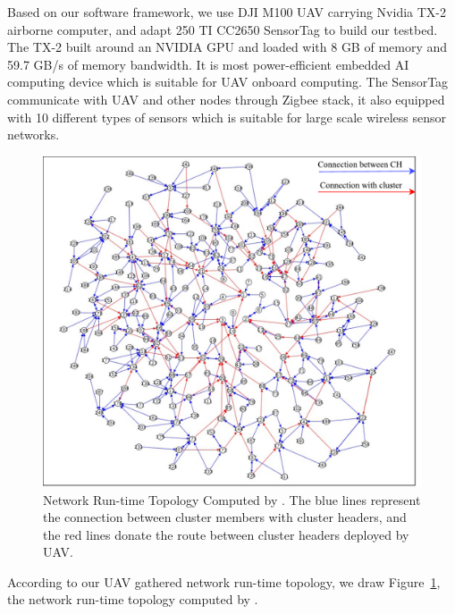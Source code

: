 Based on our software framework, we use DJI M100 UAV carrying Nvidia TX-2 airborne
computer, and adapt 250 TI CC2650 SensorTag to build our testbed. The TX-2 built around an NVIDIA GPU 
and loaded with 8 GB of memory and 59.7 GB/s of memory bandwidth. It is most power-efficient embedded 
AI computing device which is suitable for UAV onboard computing. The SensorTag communicate with UAV and
other nodes through Zigbee stack, it also equipped with 10 different types of sensors which is suitable for 
large scale wireless sensor networks.

\begin{figure}[htbp]
	\centering
	\includegraphics[width=.85\columnwidth]{Figure/topology}
	\vspace{-0.1in}
	\caption{Network Run-time Topology Computed by {\sdn}. \textnormal{The blue lines
represent the connection between cluster members with cluster headers, and the
red lines donate the route between cluster headers deployed by UAV.}}
	
	\label{topology}
	\vspace{-0.1in}
\end{figure}

According to our UAV gathered network run-time topology, we draw Figure~\ref{topology}, the network run-time topology computed by {\sdn}.

